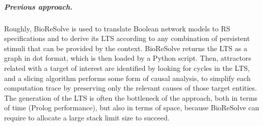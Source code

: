 \subparagraph*{Previous approach.}
Roughly, BioReSolve is used to translate Boolean network models to RS specifications and to derive its LTS according to any combination of persistent stimuli that can be provided by the context. BioReSolve returns the LTS as a graph in dot format, which is then loaded by a Python script. Then, attractors related with a target of interest are identified by looking for cycles in the LTS, and a slicing algorithm performs some form of causal analysis, to simplify each computation trace by preserving only the relevant causes of those target entities. 
The generation of the LTS is often the bottleneck of the approach, both in terms of time (Prolog performance), but also in terms of space, because BioReSolve can require to allocate a large stack limit size to succeed. 

% 
%

